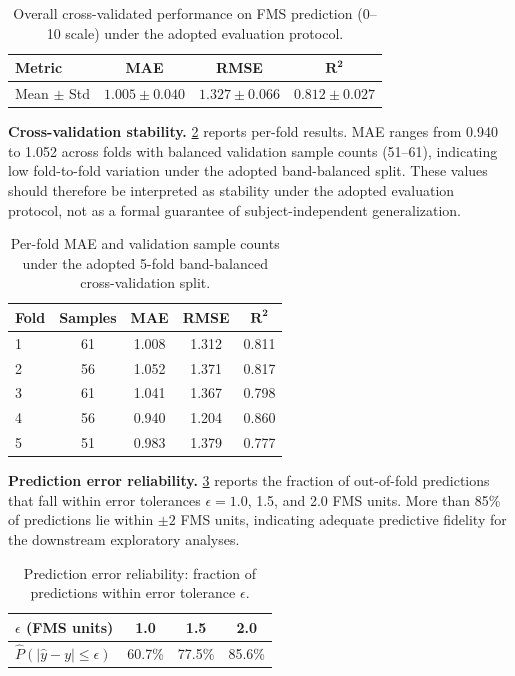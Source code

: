 \documentclass[review]{vgtc}              %
\begin{document}
\begin{table}[tb]
\centering
\caption{Overall cross-validated performance on FMS prediction (0--10 scale) under the adopted evaluation protocol.}
\begin{tabular}{lccc}
\toprule
\textbf{Metric} & \textbf{MAE} & \textbf{RMSE} & $\mathbf{R^2}$ \\
\midrule
Mean $\pm$ Std & $1.005 \pm 0.040$ & $1.327 \pm 0.066$ & $0.812 \pm 0.027$ \\
\bottomrule
\end{tabular}
\label{tab:overall}
\end{table}

\textbf{Cross-validation stability.}
\cref{tab:folds} reports per-fold results. MAE ranges from 0.940 to 1.052 across folds with balanced validation sample counts (51--61), indicating low fold-to-fold variation under the adopted band-balanced split. These values should therefore be interpreted as stability under the adopted evaluation protocol, not as a formal guarantee of subject-independent generalization.

\begin{table}[tb]
\centering
\caption{Per-fold MAE and validation sample counts under the adopted 5-fold band-balanced cross-validation split.}
\begin{tabular}{lcccc}
\toprule
\textbf{Fold} & \textbf{Samples} & \textbf{MAE} & \textbf{RMSE} & $\mathbf{R^2}$ \\
\midrule
1 & 61 & 1.008 & 1.312 & 0.811 \\
2 & 56 & 1.052 & 1.371 & 0.817 \\
3 & 61 & 1.041 & 1.367 & 0.798 \\
4 & 56 & 0.940 & 1.204 & 0.860 \\
5 & 51 & 0.983 & 1.379 & 0.777 \\
\bottomrule
\end{tabular}
\label{tab:folds}
\end{table}

\textbf{Prediction error reliability.}
\cref{tab:errorbound} reports the fraction of out-of-fold predictions that fall within error tolerances $\epsilon = 1.0$, 1.5, and 2.0 FMS units. More than 85\% of predictions lie within $\pm 2$ FMS units, indicating adequate predictive fidelity for the downstream exploratory analyses.

\begin{table}[tb]
\centering
\caption{Prediction error reliability: fraction of predictions within error tolerance $\epsilon$.}
\begin{tabular}{lccc}
\toprule
$\epsilon$ (FMS units) & 1.0 & 1.5 & 2.0 \\
\midrule
$\hat{P}(|\hat{y}-y| \leq \epsilon)$ & 60.7\% & 77.5\% & 85.6\% \\
\bottomrule
\end{tabular}
\label{tab:errorbound}
\end{table}
\end{document}
